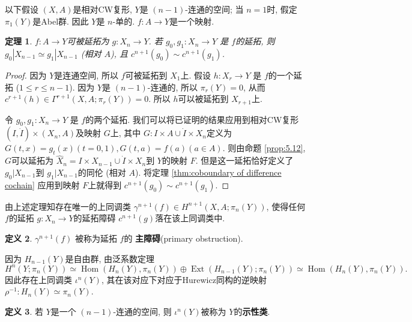 \documentclass{ctexart}
\theoremstyle{plain}
\newtheorem{theorem}{定理}[section]
\theoremstyle{definition}
\newtheorem{definition}[theorem]{定义}
\renewcommand{\emph}{\textbf}
\begin{document}
            以下假设 $(X,A)$是相对CW复形, $Y$是 $(n-1)$-连通的空间; 当 $n=1$时, 假定 $\pi_1 (Y)$是Abel群. 因此 $Y$是 $n$-单的. $f:A\to Y$是一个映射.

            \begin{theorem}
                $f:A\to Y$可被延拓为 $g:X_{n}\to Y$. 若 $g_0,g_1:X_{n}\to Y$ 是 $f$的延拓, 则 $g_0|X_{n-1}\simeq g_1|X_{n-1}$ (相对 $A$), 且 $c^{n+1}(g_0)\sim c^{n+1}(g_1)$.
            \end{theorem}

            \begin{proof}
                因为 $Y$是连通空间, 所以 $f$可被延拓到 $X_1$上. 假设 $h:X_{r}\to Y$ 是 $f$的一个延拓 ($1\le r\le n-1$). 因为 $Y$是 $(n-1)$-连通的, 所以 $\pi_{r}(Y)=0$, 从而 $c^{r+1}(h)\in \Gamma^{r+1}(X,A;\pi_{r}(Y))=0$. 所以 $h$可以被延拓到 $X_{r+1}$上.

                令 $g_0, g_1:X_{n}\to Y$ 是 $f$的两个延拓. 我们可以将已证明的结果应用到相对CW复形 $(I,\dot{I})\times (X_{n},A)$及映射 $G$上, 其中 $G:I\times A\cup \dot{I}\times X_{n}$定义为 $G(t,x)=g_{t}(x)(t=0,1),G(t,a)=f(a)(a \in A)$. 则由命题 \ref{prop:5.12}, $G$可以延拓为 $\hat{X}_{n}=I\times X_{n-1}\cup \dot{I}\times X_{n}$到 $Y$的映射 $F$. 但是这一延拓恰好定义了 $g_0|X_{n-1}$到 $g_1|X_{n-1}$的同伦 (相对 $A$). 将定理 \ref{thm:coboundary of difference cochain} 应用到映射 $F$上就得到 $c^{n+1}(g_{0})\sim c^{n+1}(g_1)$.
            \end{proof}

            由上述定理知存在唯一的上同调类 $\gamma^{n+1}(f) \in H^{n+1}(X,A;\pi_{n}(Y))$, 使得任何 $f$的延拓 $g:X_{n}\to Y$的延拓障碍 $c^{n+1}(g)$落在该上同调类中. 
            
            \begin{definition}
                $\gamma^{n+1}(f)$ 被称为延拓 $f$的 \emph{主障碍}(primary obstruction).
            \end{definition}
            
            因为 $H_{n-1}(Y)$是自由群, 由泛系数定理 
            \begin{equation*}
              H^{n}(Y;\pi_{n}(Y))\simeq \operatorname{Hom}(H_{n}(Y),\pi_{n}(Y))\oplus \operatorname{Ext}(H_{n-1}(Y);\pi_{n}(Y))\simeq \operatorname{Hom}(H_{n}(Y),\pi_{n}(Y)).
            \end{equation*}
            因此存在上同调类 $\iota^{n}(Y)$, 其在该对应下对应于Hurewicz同构的逆映射 $\rho^{-1}:H_{n}(Y)\simeq \pi_{n}(Y)$.

            \begin{definition}
                若 $Y$是一个 $(n-1)$-连通的空间, 则 $\iota^{n}(Y)$被称为 $Y$的\emph{示性类}.
            \end{definition}
\end{document}
